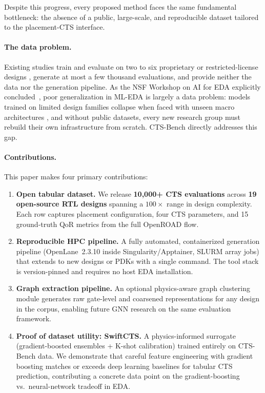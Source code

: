 \documentclass[acmsmall,review,anonymous]{acmart}
\begin{document}
Despite this progress, every proposed method faces the same fundamental
bottleneck: the absence of a public, large-scale, and reproducible
dataset tailored to the placement-CTS interface.

\paragraph{The data problem.}
Existing studies train and evaluate on two to six proprietary or
restricted-license designs \cite{gan-cts,nagaria2020}, generate at most a
few thousand evaluations, and provide neither the data nor the generation
pipeline. As the NSF Workshop on AI for EDA explicitly
concluded~\cite{nsfReport}, poor generalization in ML-EDA is largely a
data problem: models trained on limited design families collapse when faced
with unseen macro architectures \cite{zhengDAC,ghoseICCAD}, and without
public datasets, every new research group must rebuild their own
infrastructure from scratch.
CTS-Bench directly addresses this gap.

\paragraph{Contributions.}
This paper makes four primary contributions:
\begin{enumerate}[leftmargin=*,topsep=2pt,itemsep=2pt]
  \item \textbf{Open tabular dataset.} We release \textbf{10,000+ CTS
    evaluations} across \textbf{19 open-source RTL designs} spanning a
    $100\times$ range in design complexity. Each row captures placement
    configuration, four CTS parameters, and 15 ground-truth QoR metrics from
    the full OpenROAD flow.

  \item \textbf{Reproducible HPC pipeline.} A fully automated, containerized
    generation pipeline (OpenLane~2.3.10 inside Singularity/Apptainer, SLURM
    array jobs) that extends to new designs or PDKs with a single command.
    The tool stack is version-pinned and requires no host EDA installation.

  \item \textbf{Graph extraction pipeline.} An optional physics-aware graph
    clustering module generates raw gate-level and coarsened representations
    for any design in the corpus, enabling future GNN research on the same
    evaluation framework.

  \item \textbf{Proof of dataset utility: SwiftCTS.} A physics-informed
    surrogate (gradient-boosted ensembles + K-shot calibration) trained
    entirely on CTS-Bench data. We demonstrate that careful feature engineering
    with gradient boosting matches or exceeds deep learning baselines for
    tabular CTS prediction, contributing a concrete data point on the
    gradient-boosting vs.\ neural-network tradeoff in EDA.
\end{enumerate}
\end{document}
